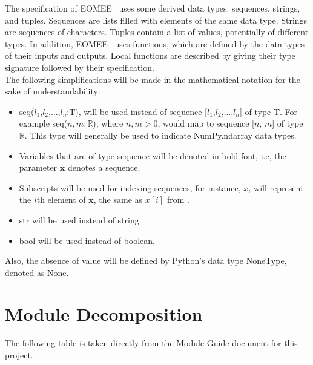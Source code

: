 \documentclass[12pt, titlepage]{article}
\begin{document}
\noindent
The specification of EOMEE \ uses some derived data types: sequences, strings, 
and tuples. Sequences are lists filled with elements of the same data type. 
Strings are sequences of characters. Tuples contain a list of values, 
potentially of different types. In addition, EOMEE \ uses functions, which
are defined by the data types of their inputs and outputs. Local functions are
described by giving their type signature followed by their specification.\\
The following simplifications will be made in the mathematical notation for the 
sake of understandability:
\begin{itemize}
	\item seq($l_1$,$l_2$,...,$l_n$:T), will be used instead of 
	sequence 
	[$l_1$,$l_2$,...,$l_n$] of type T. For example seq($n,m:\mathbb{R}$), where 
	$n,m > 0$, would map to sequence [$n$, $m$] of type $\mathbb{R}$. This 
	type will generally be used to indicate NumPy.ndarray data types.
	\item Variables that are of type sequence will be denoted in bold font, 
	i.e, the parameter $\textbf{x}$ denotes a sequence. 
	\item Subscripts will be used for indexing sequences, for instance, $x_i$ 
	will represent the $i$th element of $\textbf{x}$, the same as $x[i]$ from 
	\citet{HoffmanAndStrooper1995}.
	\item str will be used instead of string.
	\item bool will be used instead of boolean.
\end{itemize}
Also, the absence of value will be defined by Python's data type NoneType, 
denoted as None.


\section{Module Decomposition}

The following table is taken directly from the Module Guide document for this project.
\end{document}
